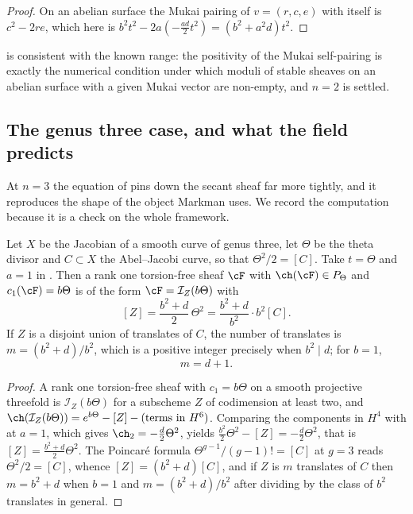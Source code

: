 \begin{proof}
On an abelian surface the Mukai pairing of $v=(r,c,e)$ with itself is
$c^{2}-2re$, which here is $b^{2}t^{2}-2a(-\tfrac{ad}{2}t^{2})=(b^{2}+a^{2}d)t^{2}$.
\end{proof}

 is consistent with the known range: the positivity of
the Mukai self-pairing is exactly the numerical condition under which moduli
of stable sheaves on an abelian surface with a given Mukai vector are
non-empty, and $n=2$ is settled.

\subsection{The genus three case, and what the field predicts}

At $n=3$ the equation of  pins down the secant
sheaf far more tightly, and it reproduces the shape of the object Markman
uses. We record the computation because it is a check on the whole framework.

\begin{proposition}[Rank one at $n=3$]\label{prop:genus3}
Let $X$ be the Jacobian of a smooth curve of genus three, let $\Theta$ be the
theta divisor and $C\subset X$ the Abel--Jacobi curve, so that
$\Theta^{2}/2=[C]$. Take $t=\Theta$ and $a=1$ in
. Then a rank one torsion-free sheaf $\cF$ with
$\ch(\cF)\in P_{\Theta}$ and $c_{1}(\cF)=b\Theta$ is of the form
$\cF=\mathcal{I}_{Z}(b\Theta)$ with
\[
  [Z]=\frac{b^{2}+d}{2}\,\Theta^{2}
     =\frac{b^{2}+d}{b^{2}}\cdot b^{2}[C].
\]
If $Z$ is a disjoint union of translates of $C$, the number of translates is
$m=(b^{2}+d)/b^{2}$, which is a positive integer precisely when $b^{2}\mid d$;
for $b=1$,
\[
  m=d+1 .
\]
\end{proposition}

\begin{proof}
A rank one torsion-free sheaf with $c_{1}=b\Theta$ on a smooth projective
threefold is $\mathcal{I}_{Z}(b\Theta)$ for a subscheme $Z$ of codimension at
least two, and
$\ch(\mathcal{I}_{Z}(b\Theta))=e^{b\Theta}-[Z]-(\text{terms in }H^{6})$.
Comparing the components in $H^{4}$ with  at $a=1$,
which gives $\ch_{2}=-\tfrac{d}{2}\Theta^{2}$, yields
$\tfrac{b^{2}}{2}\Theta^{2}-[Z]=-\tfrac{d}{2}\Theta^{2}$, that is
$[Z]=\tfrac{b^{2}+d}{2}\Theta^{2}$. The Poincar\'e formula
$\Theta^{g-1}/(g-1)!=[C]$ at $g=3$ reads $\Theta^{2}/2=[C]$, whence
$[Z]=(b^{2}+d)[C]$, and if $Z$ is $m$ translates of $C$ then $m=b^{2}+d$ when
$b=1$ and $m=(b^{2}+d)/b^{2}$ after dividing by the class of $b^{2}$
translates in general.
\end{proof}

